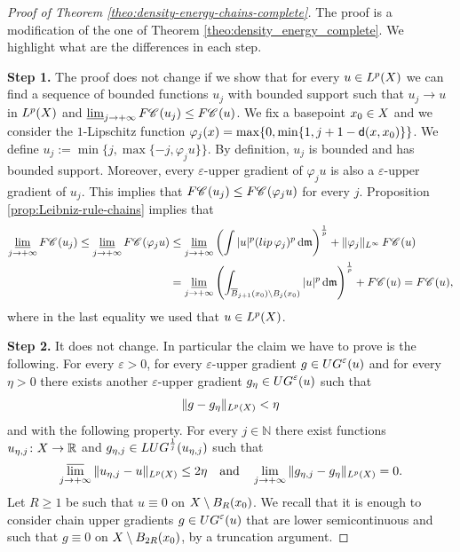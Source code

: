 \documentclass[10pt,a4paper]{amsart}
\newcommand{\Chain}[1]{\mathscr{C}^{#1}}
\newcommand{\F}{{\rm F}}
\newcommand{\LUG}[1]{{\rm LUG}^{#1}}
\newcommand{\N}{\mathbb{N}}
\newcommand{\R}{\mathbb{R}}
\newcommand{\UG}[1]{{\rm UG}^{#1}}
\newcommand{\X}{{\rm X}}
\newcommand{\limi}{\varliminf}
\newcommand{\lims}{\varlimsup}
\newcommand{\lip}{{\rm lip}}
\newcommand{\mm}{\mathfrak m}
\newcommand{\sfd}{{\sf d}}
\renewcommand{\d}{{\mathrm d}}
\begin{document}
\begin{proof}[Proof of Theorem \ref{theo:density-energy-chains-complete}]
    The proof is a modification of the one of Theorem \ref{theo:density_energy_complete}. We highlight what are the differences in each step.
    
    {\bf Step 1.} The proof does not change if we show that for every $u\in L^p(\X)$ we can find a sequence of bounded functions $u_j$ with bounded support such that $u_j \to u$ in $L^p(\X)$ and $\limi_{j\to +\infty}\F{\Chain{}}(u_j) \le \F{\Chain{}}(u)$. We fix a basepoint $x_0 \in \X$ and we consider the $1$-Lipschitz function $\varphi_j(x) = \max\{0,\min\{1,j+1-\sfd(x,x_0)\}\}$. We define $u_j := \min \{j, \max\{-j, \varphi_j u\}\}$. By definition, $u_j$ is bounded and has bounded support. Moreover, every $\varepsilon$-upper gradient of $\varphi_j u$ is also a $\varepsilon$-upper gradient of $u_j$. This implies that $\F{\Chain{}}(u_j) \le \F{\Chain{}}(\varphi_j u)$ for every $j$. Proposition \ref{prop:Leibniz-rule-chains} implies that
    \begin{equation}
        \begin{aligned}
            \limi_{j\to +\infty} \F{\Chain{}}(u_j) \le \limi_{j\to +\infty} \F{\Chain{}}(\varphi_j u) &\le \limi_{j\to +\infty}\left( \int |u|^p (\lip\,\varphi_j)^p \,\d \mm \right)^{\frac{1}{p}} + \|\varphi_j\|_{L^\infty}\, \F{\Chain{}}(u)\\
            &= \limi_{j\to +\infty}\left( \int_{\overline{B}_{j+1}(x_0)\setminus B_j(x_0)} |u|^p \,\d \mm \right)^{\frac{1}{p}} +\F{\Chain{}}(u) = \F{\Chain{}}(u),
        \end{aligned}
    \end{equation}
    where in the last equality we used that $u\in L^p(\X)$.
    
    {\bf Step 2.} It does not change. In particular the claim we have to prove is the following. For every $\varepsilon > 0$, for every $\varepsilon$-upper gradient $g\in \UG{\varepsilon}(u)$ and for every $\eta > 0$ there exists another $\varepsilon$-upper gradient $g_\eta \in \UG{\varepsilon}(u)$ such that 
    \begin{equation}
        \label{eq:approx_with_g_eta_chains}
        \Vert g - g_\eta \Vert_{L^p(\X)} < \eta
    \end{equation} 
    and with the following property. For every $j\in \N$ there exist functions $u_{\eta,j} \colon \X \to \R$ and $g_{\eta,j}\in \LUG{\frac{1}{j}}(u_{\eta,j})$ such that 
    \begin{equation}
        \label{eq:approx_with_u_eta,j_chain}
        \lims_{j\to +\infty} \Vert u_{\eta,j} - u \Vert_{L^p(\X)} \le 2\eta \quad \text{and} \quad \lim_{j\to +\infty} \Vert g_{\eta,j} - g_\eta \Vert_{L^p(\X)} = 0.
    \end{equation}
    Let $R\ge 1$ be such that $u\equiv 0$ on $\X\setminus B_{R}(x_0)$. We recall that it is enough to consider chain upper gradients $g\in \UG{\varepsilon}(u)$ that are lower semicontinuous and such that $g \equiv 0$ on $\X \setminus B_{2R}(x_0)$, by a truncation argument.


\end{proof}
\end{document}

